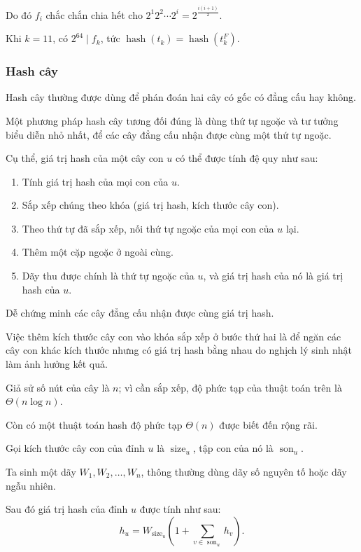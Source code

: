 \documentclass[11pt]{article}
\begin{document}
Do đó $f_i$ chắc chắn chia hết cho
$2^1 2^2\cdots 2^i = 2^{\frac{i(i+1)}{2}}$.

Khi $k=11$, có $2^{64}\mid f_k$, tức
$\operatorname{hash}(t_k)=\operatorname{hash}(t_k^F)$.

\subsubsection{Hash cây}

Hash cây thường được dùng để phán đoán hai cây có gốc có đẳng cấu hay không.

Một phương pháp hash cây tương đối đúng là dùng thứ tự ngoặc và tư tưởng biểu
diễn nhỏ nhất, để các cây đẳng cấu nhận được cùng một thứ tự ngoặc.

Cụ thể, giá trị hash của một cây con $u$ có thể được tính đệ quy như sau:

\begin{enumerate}
  \item Tính giá trị hash của mọi con của $u$.
  \item Sắp xếp chúng theo khóa (giá trị hash, kích thước cây con).
  \item Theo thứ tự đã sắp xếp, nối thứ tự ngoặc của mọi con của $u$ lại.
  \item Thêm một cặp ngoặc ở ngoài cùng.
  \item Dãy thu được chính là thứ tự ngoặc của $u$, và giá trị hash của nó là
  giá trị hash của $u$.
\end{enumerate}

Dễ chứng minh các cây đẳng cấu nhận được cùng giá trị hash.

Việc thêm kích thước cây con vào khóa sắp xếp ở bước thứ hai là để ngăn các cây
con khác kích thước nhưng có giá trị hash bằng nhau do nghịch lý sinh nhật làm
ảnh hưởng kết quả.

Giả sử số nút của cây là $n$; vì cần sắp xếp, độ phức tạp của thuật toán trên
là $\Theta(n\log n)$.

Còn có một thuật toán hash độ phức tạp $\Theta(n)$ được biết đến rộng rãi.

Gọi kích thước cây con của đỉnh $u$ là $\operatorname{size}_u$, tập con của nó
là $\operatorname{son}_u$.

Ta sinh một dãy $W_1,W_2,\ldots,W_n$, thông thường dùng dãy số nguyên tố hoặc
dãy ngẫu nhiên.

Sau đó giá trị hash của đỉnh $u$ được tính như sau:
\[
h_u=W_{\operatorname{size}_u}\left(1+\sum_{v\in \operatorname{son}_u}h_v\right).
\]
\end{document}
